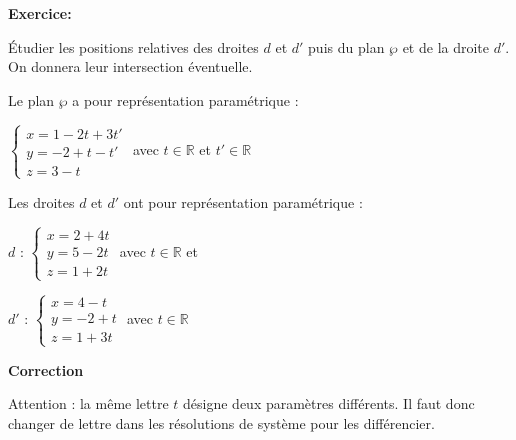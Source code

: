 \documentclass{cornouaille}
\begin{document}
\begin{methode}

  

\textbf{Exercice:}



  

  \bgroup
  \def\columnseprule{.5pt}
  \begin{multicols}{2}
    Étudier  les positions relatives des
    droites $d$ et  $d'$ puis du plan $\wp$ et de la droite $d'$. On
    donnera leur intersection éventuelle.

    Le plan $\wp$ a pour représentation paramétrique :

    $\begin{cases} x=1-2t+3t'\\y=-2+t-t'\\z=3-t \end{cases}$ avec
    $t\in\mathbb{R}$ et $t'\in\mathbb{R}$

    

    Les droites $d$ et $d'$ ont pour représentation \mbox{paramétrique} :

    $d$ : $\begin{cases} x=2+4t\\y=5-2t\\z=1+2t \end{cases}$ avec
    $t\in\mathbb{R}$ et 

    $d'$ : $\begin{cases} x=4-t\\y=-2+t\\z=1+3t \end{cases}$ avec
    $t\in\mathbb{R}$
  \end{multicols}
  \egroup

  

\textbf{Correction}



Attention : la même lettre $t$ désigne deux paramètres différents. Il faut donc changer de lettre dans les résolutions de système pour les différencier.\\


\end{methode}
\end{document}
